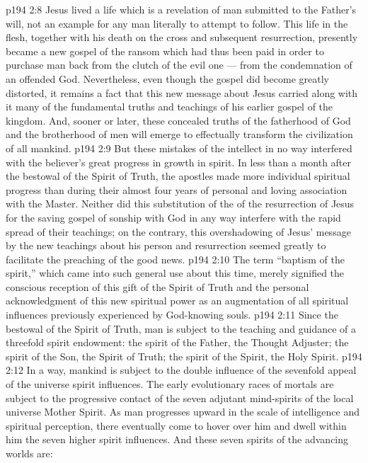 \vs p194 2:8 \pc Jesus lived a life which is a revelation of man submitted to the Father’s will, not an example for any man literally to attempt to follow. This life in the flesh, together with his death on the cross and subsequent resurrection, presently became a new gospel of the ransom which had thus been paid in order to purchase man back from the clutch of the evil one --- from the condemnation of an offended God. Nevertheless, even though the gospel did become greatly distorted, it remains a fact that this new message about Jesus carried along with it many of the fundamental truths and teachings of his earlier gospel of the kingdom. And, sooner or later, these concealed truths of the fatherhood of God and the brotherhood of men will emerge to effectually transform the civilization of all mankind.
\vs p194 2:9 But these mistakes of the intellect in no way interfered with the believer’s great progress in growth in spirit. In less than a month after the bestowal of the Spirit of Truth, the apostles made more individual spiritual progress than during their almost four years of personal and loving association with the Master. Neither did this substitution of the  of the resurrection of Jesus for the saving gospel  of sonship with God in any way interfere with the rapid spread of their teachings; on the contrary, this overshadowing of Jesus’ message by the new teachings about his person and resurrection seemed greatly to facilitate the preaching of the good news.
\vs p194 2:10 \pc The term “baptism of the spirit,” which came into such general use about this time, merely signified the conscious reception of this gift of the Spirit of Truth and the personal acknowledgment of this new spiritual power as an augmentation of all spiritual influences previously experienced by God\hyp{}knowing souls.
\vs p194 2:11 \pc Since the bestowal of the Spirit of Truth, man is subject to the teaching and guidance of a threefold spirit endowment: the spirit of the Father, the Thought Adjuster; the spirit of the Son, the Spirit of Truth; the spirit of the Spirit, the Holy Spirit.
\vs p194 2:12 In a way, mankind is subject to the double influence of the sevenfold appeal of the universe spirit influences. The early evolutionary races of mortals are subject to the progressive contact of the seven adjutant mind\hyp{}spirits of the local universe Mother Spirit. As man progresses upward in the scale of intelligence and spiritual perception, there eventually come to hover over him and dwell within him the seven higher spirit influences. And these seven spirits of the advancing worlds are:
